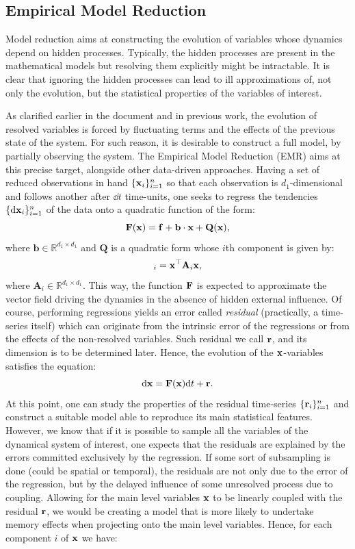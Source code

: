 \documentclass[12pt]{article}
\begin{document}
\subsection{Empirical Model Reduction}

Model reduction aims at constructing the evolution of variables whose dynamics depend on  hidden processes. Typically, the hidden processes are present in the mathematical models but resolving them explicitly might be intractable. It is clear that ignoring the hidden processes can lead to ill approximations of, not only the evolution, but the statistical properties of the variables of interest.

As clarified earlier in the document and in previous work, the evolution of resolved variables is forced by fluctuating terms and the effects of the previous state of the system. For such reason, it is desirable to construct a full model, by partially observing the system. The Empirical Model Reduction (EMR) aims at this precise target, alongside other data-driven approaches. Having a set of reduced observations in hand $\{\mathbf{x}_i\}_{i=1}^{n}$ so that each observation is $d_1$-dimensional and follows another after $\dd t$ time-units, one seeks to regress the tendencies $\{\mathrm{d} \mathbf{x} _i\}_{i=1}^{n}$ of the data onto a quadratic function of the form:
\begin{equation}
	\mathbf{F}(\mathbf{x})=\mathbf{f} + \mathbf{b}\cdot \mathbf{x} +\mathbf{Q}(\mathbf{x}),
\end{equation}
 where $\mathbf{b}\in \mathbb{R}^{d_1\times d_1}$ and $\mathbf{Q}$ is a quadratic form whose $i$th component is given by:
 \begin{equation}
 [\mathbf{Q}]_i=\xx^{\top}\mathbf{A}_i\xx,
 \end{equation}
where $\mathbf{A}_i \in \mathbb{R}^{d_1 \times d_1}$. This way, the function $\mathbf{F}$ is expected to approximate the vector field driving the dynamics in the absence of hidden external influence. Of course, performing regressions yields an error called \emph{residual} (practically, a time-series itself) which can originate from the intrinsic error of the regressions or from the effects of the non-resolved variables. Such residual we call $\mathbf{r}$, and its dimension is to be determined later. Hence, the evolution of the $\mathbf{x}$-variables satisfies the equation:
 \begin{equation}
 	\mathrm{d} \mathbf{x} = \mathbf{F}(\mathbf{x})\mathrm{d} t + \mathbf{r}.
 \end{equation}
 At this point, one can study the properties of the residual time-series $\{\mathbf{r}_i\}_{i=1}^{n}$ and construct a suitable model able to reproduce its main statistical features. However, we know that if it is possible to sample all the variables of the dynamical system of interest, one expects that the residuals are explained by the errors committed exclusively by the regression. If some sort of subsampling is done (could be spatial or temporal), the residuals are not only due to the error of the regression, but by the delayed influence of some unresolved process due to coupling. Allowing for the main level variables $\mathbf{x}$ to be linearly coupled with the residual $\mathbf{r}$, we would be creating a model that is more likely to undertake memory effects when projecting onto the main level variables. Hence, for each component $i$ of $\mathbf{x}$ we have:
\end{document}
